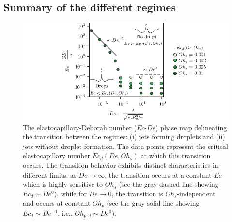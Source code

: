 \documentclass{jfm}
\begin{document}
\subsection{Summary of the different regimes}
\label{subsec:summaryRegimes}

\begin{figure}
	\centering
	\includegraphics[width=\textwidth]{Transtion_07_onlyDrops-eps-converted-to.pdf}
	\caption{The elastocapillary-Deborah number ($Ec$-$De$) phase map delineating the transition between the regimes: (i) jets forming droplets and (ii) jets without droplet formation. The data points represent the critical elastocapillary number $Ec_d(De, Oh_s)$ at which this transition occurs. The transition behavior exhibits distinct characteristics in different limits: as $De \to \infty$, the transition occurs at a constant $Ec$ which is highly sensitive to $Oh_s$ (see the gray dashed line showing $Ec_d \sim De^0$), while for $De \to 0$, the transition is $Oh_s$-independent and occurs at constant $Oh_p$ (see the gray solid line showing $Ec_d \sim De^{-1}$, i.e., $Oh_{p,d} \sim De^0$).}
	\label{fig:transitionDrops}
\end{figure}
\end{document}
